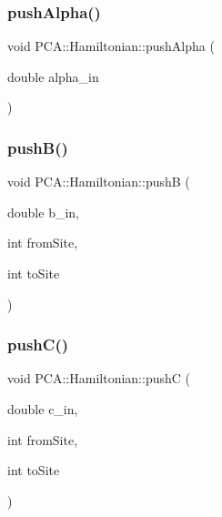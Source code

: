 \hypertarget{class_p_c_a_1_1_hamiltonian_aa1acb10e2078e74b747892db50a0342c}{}\label{class_p_c_a_1_1_hamiltonian_aa1acb10e2078e74b747892db50a0342c} 
\subsubsection{\texorpdfstring{push\+Alpha()}{pushAlpha()}}
{\footnotesize\ttfamily void P\+C\+A\+::\+Hamiltonian\+::push\+Alpha (\begin{DoxyParamCaption}\item[{double}]{alpha\+\_\+in }\end{DoxyParamCaption})}

\hypertarget{class_p_c_a_1_1_hamiltonian_a5390261dba56862d9ce18d0102f81ce1}{}\label{class_p_c_a_1_1_hamiltonian_a5390261dba56862d9ce18d0102f81ce1} 
\subsubsection{\texorpdfstring{push\+B()}{pushB()}}
{\footnotesize\ttfamily void P\+C\+A\+::\+Hamiltonian\+::pushB (\begin{DoxyParamCaption}\item[{double}]{b\+\_\+in,  }\item[{int}]{from\+Site,  }\item[{int}]{to\+Site }\end{DoxyParamCaption})}

\hypertarget{class_p_c_a_1_1_hamiltonian_a9ca9ef677e2fedc8d82faca80e216e17}{}\label{class_p_c_a_1_1_hamiltonian_a9ca9ef677e2fedc8d82faca80e216e17} 
\subsubsection{\texorpdfstring{push\+C()}{pushC()}}
{\footnotesize\ttfamily void P\+C\+A\+::\+Hamiltonian\+::pushC (\begin{DoxyParamCaption}\item[{double}]{c\+\_\+in,  }\item[{int}]{from\+Site,  }\item[{int}]{to\+Site }\end{DoxyParamCaption})}

